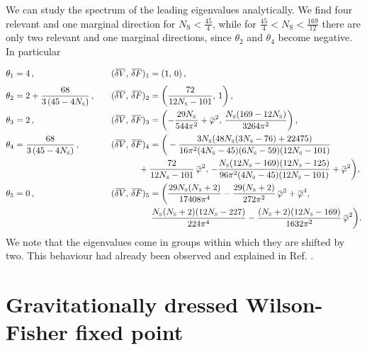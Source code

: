 \documentclass[11pt]{book}
\newcommand{\overbar}[1]{\mkern 1.5mu\overline{\mkern-1.5mu#1\mkern-1.5mu}\mkern 1.5mu}
\newcommand\NS{ N_{\scriptscriptstyle{\mathrm{S}}} }
\newcommand{\deltaV}{\overbar {\delta V}}
\newcommand{\deltaF}{\overbar {\delta F}}
\newcommand{\bp}{\overbar \varphi}
\numberwithin{equation}{chapter}
\begin{document}
We can study the spectrum of the leading eigenvalues analytically.
We find four relevant and one marginal direction for $\NS<\frac{45}{4}$,
while for $\frac{45}{4}<\NS<\frac{169}{12}$ there are only two relevant and one marginal directions,
since $\theta_2$ and $\theta_4$ become negative. In particular
\begin{alignat}{2}
  \theta_1 &= 4 \,,                                      && (\deltaV, \, \deltaF)_1 = \vphantom{\frac 11} (1, \, 0) \,, \nonumber \\
  \theta_2 &= 2 + \frac{68}{3 \, (45 - 4\NS)} \,, \quad  && (\deltaV, \, \deltaF)_2 = \left( \frac{72}{12 \NS - 101}, \, 1 \right)  , \nonumber\\
  \theta_3 &= 2 \,,                                      && (\deltaV, \, \deltaF)_3 = \left( -\frac{29 \NS}{544\pi^2} + \bp^2, \, \frac{\NS(169 - 12 \NS)}{3264\pi^2}\right) , \nonumber\\
  \theta_4 &=     \frac{68}{3 \, (45 - 4\NS)} \,,        && (\deltaV, \, \deltaF)_4 = \bigg( -\frac{3\NS(48\NS(3 \NS - 76)+22475)}{16\pi^2(4\NS - 45)(6\NS - 59) (12\NS - 101)} \nonumber \\
                                                       & && \hspace{1.1cm} + \frac{72}{12\NS - 101} \, \bp^2, \,  - \frac{\NS(12\NS - 169)(12\NS-125)} {96\pi^2(4\NS - 45)(12 \NS - 101)}+\bp^2\bigg) , \nonumber \\
  \theta_5 &= 0 \,,                                      && (\deltaV, \, \deltaF)_5 = \bigg( \frac{29 \NS (\NS+2)}{17408\pi^4} - \frac{29(\NS+2)}{272\pi ^2} \, \bp^2 + \bp^4, \nonumber \\
                                                       & && \hspace{1.6cm} \frac{\NS (\NS+2) (12 \NS - 227)}{224\pi ^4}-\frac{(\NS+2) (12 \NS - 169) }{1632\pi^2} \, \bp^2 \bigg) .
\end{alignat}
We note that the eigenvalues come in groups
within which they are shifted by two.
This behaviour had already been observed and
explained in Ref. \cite{Narain:2009fy}.


\section{Gravitationally dressed Wilson-Fisher fixed point}
\end{document}
